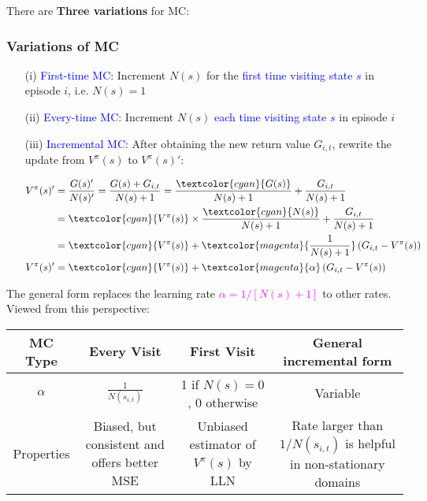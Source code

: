 \documentclass{article}
\begin{document}
There are \textbf{Three variations} for MC:
\begin{defbox}
    \subsubsection*{Variations of MC}
    \begin{enumerate}
        \item [(i)] \textcolor{blue}{First-time MC}: Increment $N(s)$ for the \textcolor{blue}{first time visiting state $s$} in episode $i$, i.e. $N(s) = 1$
        \item [(ii)] \textcolor{blue}{Every-time MC}: Increment $N(s)$ \textcolor{blue}{each time visiting state $s$} in episode $i$
        \item [(iii)] \textcolor{blue}{Incremental MC}: After obtaining the new return value $G_{i, t}$, rewrite the update from $V^{\pi}(s)$ to $V^{\pi}(s)'$:
            \begin{prfbox}
                $\begin{aligned}
                    V^{\pi}(s)' & = \frac{G(s)'}{N(s)'} = \frac{G(s) + G_{i, t}}{N(s) + 1} = \frac{\textcolor{cyan}{G(s)}}{N(s) + 1} + \frac{G_{i, t}}{N(s) + 1} \\
                    & = \textcolor{cyan}{V^{\pi}(s)} \times \frac{\textcolor{cyan}{N(s)}}{N(s) + 1} + \frac{G_{i, t}}{N(s) + 1} \\
                    & = \textcolor{cyan}{V^{\pi}(s)} + \textcolor{magenta}{\frac{1}{N(s) + 1}} \left( G_{i, t} - V^{\pi}(s) \right) \\
                    V^{\pi}(s)' & = \textcolor{cyan}{V^{\pi}(s)} + \textcolor{magenta}{\alpha} \left( G_{i, t} - V^{\pi}(s) \right)
                \end{aligned}$
            \end{prfbox}
    \end{enumerate}
\end{defbox}

The general form replaces the learning rate \textcolor{magenta}{$\alpha = 1/[N(s) + 1]$} to other rates. Viewed from this perspective:
\begin{center}
    \begin{tabular}{|c||c|c|c|}
    \hline
     MC Type & Every Visit & First Visit & General incremental form \\ \hline
     $\alpha$ & 
        $\frac{1}{N (s_{i, t})}$ &
        1 if $N(s) = 0$, 0 otherwise &
        Variable
    \\ \hline
    Properties & 
        Biased, but consistent and offers better MSE &
        Unbiased estimator of $V^{\pi}(s)$ by LLN & 
        Rate larger than $1/N(s_{i,t})$ is helpful in non-stationary domains
    \\ \hline
    \end{tabular}
\end{center}
\end{document}
